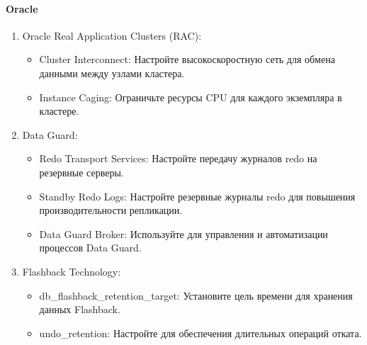 \paragraph{Oracle} \cite{availability-oracle}
\begin{enumerate}
    \item Oracle Real Application Clusters (RAC):
    \begin{itemize}
        \item Cluster Interconnect: Настройте высокоскоростную сеть для обмена данными между узлами кластера.
        \item Instance Caging: Ограничьте ресурсы CPU для каждого экземпляра в кластере.
    \end{itemize}
    \item Data Guard:
    \begin{itemize}
        \item Redo Transport Services: Настройте передачу журналов redo на резервные серверы.
        \item Standby Redo Logs: Настройте резервные журналы redo для повышения производительности репликации.
        \item Data Guard Broker: Используйте для управления и автоматизации процессов Data Guard.
    \end{itemize}
    \item Flashback Technology:
    \begin{itemize}
        \item db\_flashback\_retention\_target: Установите цель времени для хранения данных Flashback.
        \item undo\_retention: Настройте для обеспечения длительных операций отката.
    \end{itemize}
\end{enumerate}
